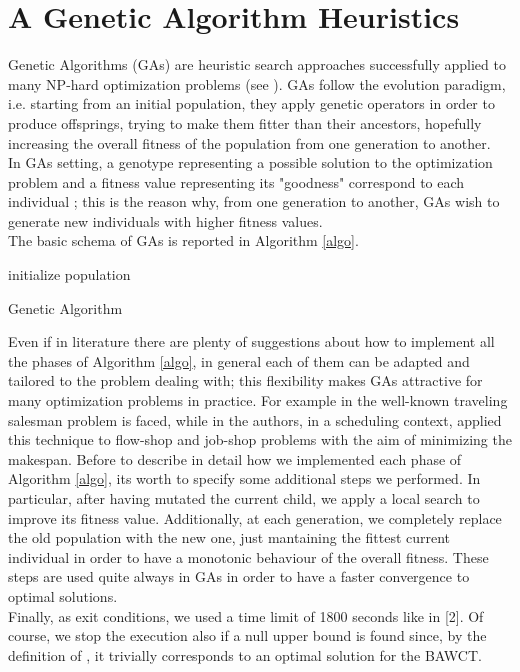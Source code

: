 \documentclass[opre,nonblindrev]{informs3} %
\begin{document}
\section{A Genetic Algorithm Heuristics}
Genetic Algorithms (GAs) are heuristic search approaches successfully applied to many NP-hard optimization problems (see \cite{kramer}). GAs follow the evolution paradigm, i.e. starting from an initial population, they apply genetic operators in order to produce offsprings, trying to make them fitter than their ancestors, hopefully increasing the overall fitness of the population from one generation to another.\\
In GAs setting, a genotype representing a possible solution to the optimization problem and a fitness value representing its "goodness" correspond to each individual ; this is the reason why, from one generation to another, GAs wish to generate new individuals with higher fitness values.\\
The	basic schema of GAs is reported in Algorithm \ref{algo}.\\
\begin{algorithm} \label{algo}
	\SetAlgoLined
	initialize population\\
	\caption{Genetic Algorithm}
\end{algorithm}
\noindent Even if in literature there are plenty of suggestions about how to implement all the phases of Algorithm \ref{algo}, in general each of them can be adapted and tailored to the problem dealing with; this flexibility makes GAs attractive for many optimization problems in practice. For example in \cite{tsp1,tsp2,tsp3} the well-known traveling salesman problem is faced, while in \cite{sched1,sched3} the authors, in a scheduling context, applied this technique to flow-shop and job-shop problems with the aim of minimizing the makespan.
Before to describe in detail how we implemented each phase of Algorithm \ref{algo}, its worth to specify some additional steps we performed. In particular, after having mutated the current child, we apply a local search to improve its fitness value. Additionally, at each generation, we completely replace the old population with the new one, just mantaining the fittest current individual in order to have a monotonic behaviour of the overall fitness. These steps are used quite always in GAs in order to have a faster convergence to optimal solutions.\\
Finally, as exit conditions, we used a time limit of 1800 seconds like in [2]. Of course, we stop the execution also if a null upper bound is found since, by the definition of , it trivially corresponds to an optimal solution for the BAWCT.\\ 
\end{document}

